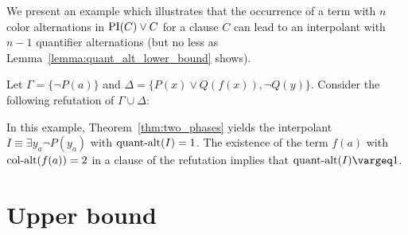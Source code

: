 \documentclass[%
	draft=false,%
	numbers=noendperiod,%
	11pt,%
	a4paper,%
	oneside,%
	openany,%
]{memoir}
\begin{document}
We present an example which illustrates that the occurrence of a term with $n$ color alternations in $\PI(C) \lor C$ for a clause $C$ can lead to an interpolant with $n-1$ quantifier alternations (but no less as Lemma~\ref{lemma:quant_alt_lower_bound} shows).
\begin{exa}
	Let $\Gamma = \{ \lnot P(a) \}$ and $\Delta = \{ P(x) \lor Q(f(x)), \lnot Q(y) \}$.
	Consider the following refutation of $\Gamma \cup \Delta$:
	\begin{prooftree}


	\end{prooftree}

	In this example, Theorem~\ref{thm:two_phases} yields the interpolant $I \equiv \exists y_a \lnot P(y_a)$ with $\qa(I) =\nolinebreak 1$.
	The existence of the term $f(a)$ with $\ca(f(a)) = 2$ in a clause of the refutation implies that $\qa(I) \vargeq 1$.
\end{exa}

\section{Upper bound}
\end{document}
